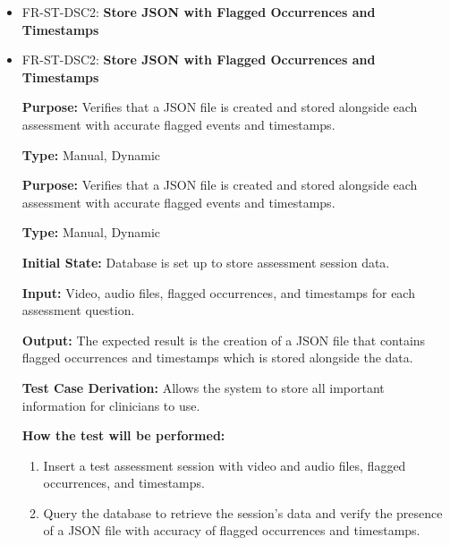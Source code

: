 \documentclass[12pt, titlepage]{article}
\begin{document}
\begin{itemize}
  \item FR-ST-DSC2: \textbf{Store JSON with Flagged Occurrences and Timestamps}
  \item FR-ST-DSC2: \textbf{Store JSON with Flagged Occurrences and Timestamps}
  \begin{mdframed}[linewidth=0.5mm]
      \textbf{Purpose:} Verifies that a JSON file is created and stored alongside each assessment with accurate flagged events and timestamps. \par
      \textbf{Type:} Manual, Dynamic \par
      \textbf{Purpose:} Verifies that a JSON file is created and stored alongside each assessment with accurate flagged events and timestamps. \par
      \textbf{Type:} Manual, Dynamic \par
      \textbf{Initial State:} Database is set up to store assessment session data. \par
      \textbf{Input:} Video, audio files, flagged occurrences, and timestamps for each assessment question. \par
      \textbf{Output:} The expected result is the creation of a JSON file that contains flagged occurrences and timestamps which is stored alongside the data. \par
      \textbf{Test Case Derivation:} Allows the system to store all important information for clinicians to use. \par
      \textbf{How the test will be performed:}
      \begin{enumerate}[noitemsep]
        \item Insert a test assessment session with video and audio files, flagged occurrences, and timestamps.
        \item Query the database to retrieve the session’s data and verify the presence of a JSON file with accuracy of flagged occurrences and timestamps.
      \end{enumerate}
  \end{mdframed}


\end{itemize}
\end{document}
